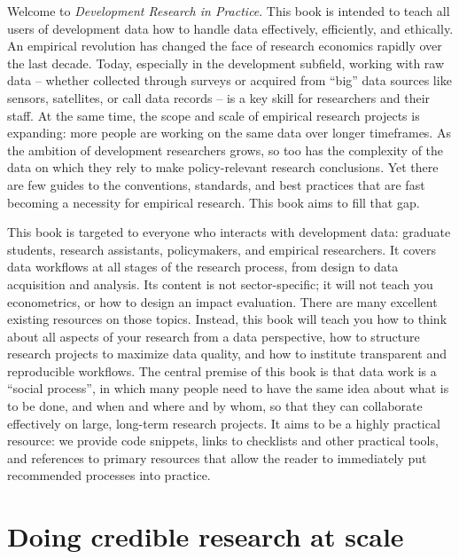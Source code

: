 \begin{fullwidth}
Welcome to \textit{Development Research in Practice}.
This book is intended to teach all users of development data
how to handle data effectively, efficiently, and ethically.
An empirical revolution has changed the face of research economics rapidly over the last decade.
Today, especially in the development subfield, working with raw data --
whether collected through surveys or acquired from ``big'' data sources
like sensors, satellites, or call data records --
is a key skill for researchers and their staff.
At the same time, the scope and scale of empirical research projects is expanding:
more people are working on the same data over longer timeframes.
As the ambition of development researchers grows, so too has the complexity of the data
on which they rely to make policy-relevant research conclusions.
Yet there are few guides to the conventions, standards, and best practices
that are fast becoming a necessity for empirical research.
This book aims to fill that gap.

This book is targeted to everyone who interacts with development data:
graduate students, research assistants, policymakers, and empirical researchers.
It covers data workflows at all stages of the research process, from design to data acquisition and analysis.
Its content is not sector-specific; it will not teach you econometrics, or how to design an impact evaluation.
There are many excellent existing resources on those topics.
Instead, this book will teach you how to think about all aspects of your research from a data perspective,
how to structure research projects to maximize data quality,
and how to institute transparent and reproducible workflows.
The central premise of this book is that data work is a ``social process'',
in which many people need to have the same idea about what is to be done, and when and where and by whom,
so that they can collaborate effectively on large, long-term research projects.
It aims to be a highly practical resource: we provide code snippets, links to checklists and other practical tools,
and references to primary resources that allow the reader to immediately put recommended processes into practice.

\end{fullwidth}


\section{Doing credible research at scale}

